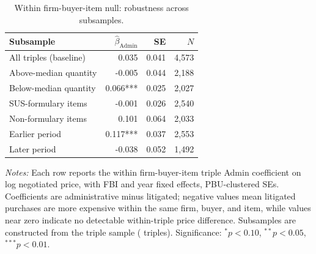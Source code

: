 \begin{table}[ht]
\centering
\caption{Within firm-buyer-item null: robustness across subsamples.}
\label{tab:within_firm_robustness}
\begin{threeparttable}
\begin{tabular}{lrrr}
\toprule
Subsample & $\hat\beta_{\text{Admin}}$ & SE & $N$ \\
\midrule
All triples (baseline) & 0.035 & 0.041 & 4,573 \\
Above-median quantity & -0.005 & 0.044 & 2,188 \\
Below-median quantity & 0.066*** & 0.025 & 2,027 \\
SUS-formulary items & -0.001 & 0.026 & 2,540 \\
Non-formulary items & 0.101 & 0.064 & 2,033 \\
Earlier period & 0.117*** & 0.037 & 2,553 \\
Later period & -0.038 & 0.052 & 1,492 \\
\bottomrule
\end{tabular}
\begin{tablenotes}[flushleft]\footnotesize
\item \textit{Notes:} Each row reports the within firm-buyer-item triple Admin coefficient on log negotiated price, with FBI and year fixed effects, PBU-clustered SEs. Coefficients are administrative minus litigated; negative values mean litigated purchases are more expensive within the same firm, buyer, and item, while values near zero indicate no detectable within-triple price difference. Subsamples are constructed from the triple sample (\BPutgTripleCountUTG{} triples). Significance: $^{*}p<0.10$, $^{**}p<0.05$, $^{***}p<0.01$.
\end{tablenotes}
\end{threeparttable}
\end{table}
